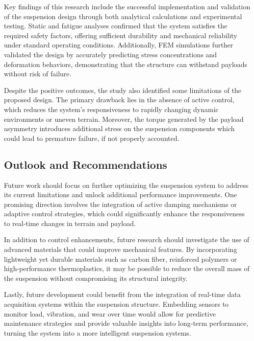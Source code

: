 \documentclass[11pt]{article}
\begin{document}
Key findings of this research include the successful implementation and validation of the suspension design through both analytical calculations and experimental testing. Static and fatigue analyses confirmed that the system satisfies the required safety factors, offering sufficient durability and mechanical reliability under standard operating conditions. Additionally, 
FEM simulations further validated the design by accurately predicting stress concentrations and deformation behaviors, demonstrating that the structure can withstand payloads without risk of failure.

Despite the positive outcomes, the study also identified some limitations of the proposed design. The primary drawback lies in the absence of active control, which reduces the system's responsiveness to rapidly changing dynamic environments or uneven terrain. Moreover, the torque generated by the payload asymmetry introduces additional stress on the suspension components which could lead to premature failure, if not properly accounted.

\subsection{Outlook and Recommendations}
Future work should focus on further optimizing the suspension system to address its current limitations and unlock additional performance improvements. One promising direction involves the integration of active damping mechanisms or adaptive control strategies, which could significantly enhance the responsiveness to real-time changes in terrain and payload.

In addition to control enhancements, future research should investigate the use of advanced materials that could improve mechanical features. By incorporating lightweight yet durable materials such as carbon fiber, reinforced polymers or high-performance thermoplastics, it may be possible to reduce the overall mass of the suspension without compromising its structural integrity.

Lastly, future development could benefit from the integration of real-time data acquisition systems within the suspension structure. Embedding sensors to monitor load, vibration, and wear over time would allow for predictive maintenance strategies and provide valuable insights into long-term performance, turning the system into a more intelligent suspension systems.

\newpage
\printbibliography
\end{document}
